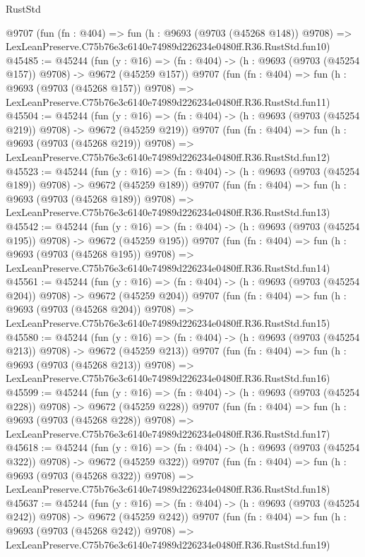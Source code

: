 \begin{lexlean}{RustStd}
\begin{coremodule}
    @9707
    (fun (fn : @404) =>
    fun (h : @9693 (@9703 (@45268 @148)) @9708) =>
    LexLeanPreserve.C75b76e3c6140e74989d226234e0480ff.R36.RustStd.fun10)
@45485 := @45244
    (fun (y : @16) => (fn : @404) -> (h : @9693 (@9703 (@45254 @157)) @9708) -> @9672 (@45259 @157))
    @9707
    (fun (fn : @404) =>
    fun (h : @9693 (@9703 (@45268 @157)) @9708) =>
    LexLeanPreserve.C75b76e3c6140e74989d226234e0480ff.R36.RustStd.fun11)
@45504 := @45244
    (fun (y : @16) => (fn : @404) -> (h : @9693 (@9703 (@45254 @219)) @9708) -> @9672 (@45259 @219))
    @9707
    (fun (fn : @404) =>
    fun (h : @9693 (@9703 (@45268 @219)) @9708) =>
    LexLeanPreserve.C75b76e3c6140e74989d226234e0480ff.R36.RustStd.fun12)
@45523 := @45244
    (fun (y : @16) => (fn : @404) -> (h : @9693 (@9703 (@45254 @189)) @9708) -> @9672 (@45259 @189))
    @9707
    (fun (fn : @404) =>
    fun (h : @9693 (@9703 (@45268 @189)) @9708) =>
    LexLeanPreserve.C75b76e3c6140e74989d226234e0480ff.R36.RustStd.fun13)
@45542 := @45244
    (fun (y : @16) => (fn : @404) -> (h : @9693 (@9703 (@45254 @195)) @9708) -> @9672 (@45259 @195))
    @9707
    (fun (fn : @404) =>
    fun (h : @9693 (@9703 (@45268 @195)) @9708) =>
    LexLeanPreserve.C75b76e3c6140e74989d226234e0480ff.R36.RustStd.fun14)
@45561 := @45244
    (fun (y : @16) => (fn : @404) -> (h : @9693 (@9703 (@45254 @204)) @9708) -> @9672 (@45259 @204))
    @9707
    (fun (fn : @404) =>
    fun (h : @9693 (@9703 (@45268 @204)) @9708) =>
    LexLeanPreserve.C75b76e3c6140e74989d226234e0480ff.R36.RustStd.fun15)
@45580 := @45244
    (fun (y : @16) => (fn : @404) -> (h : @9693 (@9703 (@45254 @213)) @9708) -> @9672 (@45259 @213))
    @9707
    (fun (fn : @404) =>
    fun (h : @9693 (@9703 (@45268 @213)) @9708) =>
    LexLeanPreserve.C75b76e3c6140e74989d226234e0480ff.R36.RustStd.fun16)
@45599 := @45244
    (fun (y : @16) => (fn : @404) -> (h : @9693 (@9703 (@45254 @228)) @9708) -> @9672 (@45259 @228))
    @9707
    (fun (fn : @404) =>
    fun (h : @9693 (@9703 (@45268 @228)) @9708) =>
    LexLeanPreserve.C75b76e3c6140e74989d226234e0480ff.R36.RustStd.fun17)
@45618 := @45244
    (fun (y : @16) => (fn : @404) -> (h : @9693 (@9703 (@45254 @322)) @9708) -> @9672 (@45259 @322))
    @9707
    (fun (fn : @404) =>
    fun (h : @9693 (@9703 (@45268 @322)) @9708) =>
    LexLeanPreserve.C75b76e3c6140e74989d226234e0480ff.R36.RustStd.fun18)
@45637 := @45244
    (fun (y : @16) => (fn : @404) -> (h : @9693 (@9703 (@45254 @242)) @9708) -> @9672 (@45259 @242))
    @9707
    (fun (fn : @404) =>
    fun (h : @9693 (@9703 (@45268 @242)) @9708) =>
    LexLeanPreserve.C75b76e3c6140e74989d226234e0480ff.R36.RustStd.fun19)

\end{coremodule}
\end{lexlean}
